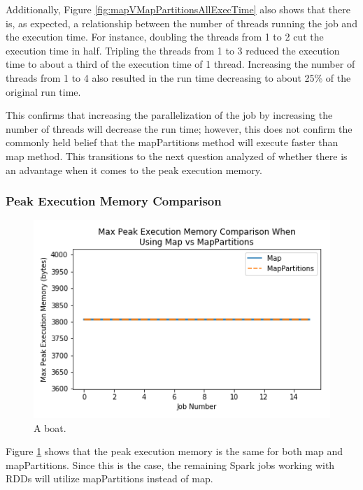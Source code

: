 \documentclass[conference]{IEEEtran}
\begin{document}
Additionally, Figure \ref{fig:mapVMapPartitionsAllExecTime} also shows that there is, as expected, a relationship between the number of threads running the job and the execution time.
For instance, doubling the threads from 1 to 2 cut the execution time in half.
Tripling the threads from 1 to 3 reduced the execution time to about a third of the execution time of 1 thread.
Increasing the number of threads from 1 to 4 also resulted in the run time decreasing to about 25\% of the original run time.

This confirms that increasing the parallelization of the job by increasing the number of threads will decrease the run time;
however, this does not confirm the commonly held belief that the mapPartitions method will execute faster than map method.
This transitions to the next question analyzed of whether there is an advantage when it comes to the peak execution memory.

\subsubsection{Peak Execution Memory Comparison}
\begin{figure}
    \includegraphics[width=\linewidth]{../python_scripts/images/mapVsMapPartitionsMaxPeakExecutionMemory.png}
    \caption{A boat.}
    \label{fig:mapVMapPartitionsMaxPeakExecutionMemory}
\end{figure}

Figure \ref{fig:mapVMapPartitionsMaxPeakExecutionMemory} shows that the peak execution memory is the same for both map and mapPartitions.
Since this is the case, the remaining Spark jobs working with RDDs will utilize mapPartitions instead of map.
\end{document}
